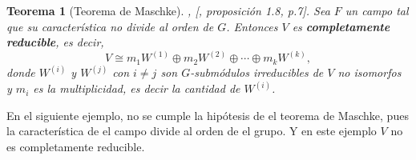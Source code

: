 \documentclass[12pt]{book}
\newtheorem{theorem}{Teorema}[section]
\theoremstyle{definition}
\newcounter{in}
\begin{document}
\begin{theorem}[Teorema de Maschke]{, [\cite{fulton1991representation}, proposición 1.8, p.7].
  \label{maschke}}
  Sea $F$ un campo tal que su característica no
  divide al orden de $G$. %
  Entonces $V$ es \textbf{completamente reducible}, es decir,
  \begin{equation*}
    V\cong m_{1}W^{(1)}\oplus m_{2}W^{(2)}\oplus\cdots \oplus m_{k}W^{(k)},
  \end{equation*}
donde $W^{(i)}$ y $W^{(j)}$ con $i\neq j$ son $G$-submódulos
irreducibles de $V$ no isomorfos y $m_{i}$ es la multiplicidad, es
decir la cantidad de $W^{(i)}$.
\end{theorem}
En el siguiente ejemplo, no se cumple la hipótesis de el teorema de
Maschke, pues la característica de el campo divide al orden de el
grupo. Y en este ejemplo $V$ no es completamente reducible.
\end{document}
